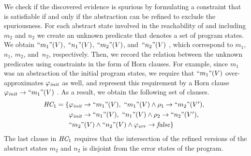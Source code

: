 We check if the discovered evidence is spurious by formulating a
constraint that is satisfiable if and only if the abstraction can be
refined to exclude the spuriousness.
For each abstract state involved in the reachability of and including
$m_2$ and $n_2$ we create an unknown predicate that denotes a set of
program states. 
We obtain $\text{``}m_1\text{''}(V)$, $\text{``}n_1\text{''}(V)$,
$\text{``}m_2\text{''}(V)$, and~$\text{``}n_2\text{''}(V)\ $, which correspond to
$m_1$, $n_1$, $m_2$, and~$n_2$, respectively.
Then, we record the relation between the unknown predicates using
constraints in the form of Horn clauses.
For example, since $m_1$ was an abstraction of the initial program
states, we require that $\text{``}m_1\text{''}(V)$ over-approximates
$\varphi_{\mathit{init}}$ as well, and represent this requirement by a Horn clause
$\varphi_{\mathit{init}} \rightarrow \text{``}m_1\text{''}(V)\ $.
As a result, we obtain the following set of clauses.
%
\begin{equation*}
  \HornClauses_1 = \set{
  \begin{array}[t]{@{}l}
    \SymbInit \limplies \unkOf{m_1}(\Vars),\ 
    \unkOf{m_1}(\Vars) \land \rel_1 \limplies \unkOf{m_2}(\Vars'),\\[\jot]
    \SymbInit \limplies \unkOf{n_1}(\Vars),\ 
    \unkOf{n_1}(\Vars) \land \rel_2 \limplies \unkOf{n_2}(\Vars'),\\[\jot]
    \unkOf{m_2}(\Vars) \land \unkOf{n_2}(\Vars) \land \SymbError \limplies 
    \lfalse }
  \end{array}
\end{equation*}
%
The last clause in $\textit{HC}_1$ requires that the intersection of
the refined versions of the abstract states $m_2$ and $n_2$ is
disjoint from the error states of the program.

